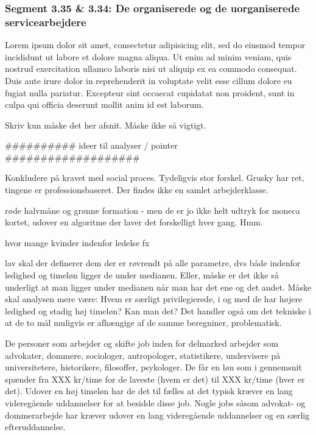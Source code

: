 %
\subsubsection{Segment 3.35 \& 3.34: De organiserede og de uorganiserede servicearbejdere }
%

Lorem ipsum dolor sit amet, consectetur adipisicing elit, sed do eiusmod
tempor incididunt ut labore et dolore magna aliqua. Ut enim ad minim veniam,
quis nostrud exercitation ullamco laboris nisi ut aliquip ex ea commodo
consequat. Duis aute irure dolor in reprehenderit in voluptate velit esse
cillum dolore eu fugiat nulla pariatur. Excepteur sint occaecat cupidatat non
proident, sunt in culpa qui officia deserunt mollit anim id est laborum.

Skriv kun måske det her afsnit. Måske ikke så vigtigt. 








\iffalse


########## ideer til analyser / pointer ###################

Konkludere på kravet med social proces. Tydeligvis stor forskel. Grusky har ret, tingene er professionsbaseret. Der findes ikke en samlet arbejderklasse. %


røde halvmåne og grønne formation - men de er jo ikke helt udtryk for moneca kortet, udover en algoritme der laver det forskelligt hver gang. Hmm. 

hvor mange kvinder indenfor ledelse fx 


lav skal der definerer dem der er røvrendt på alle parametre, dvs både indenfor ledighed og timeløn ligger de under medianen. Eller, måske er det ikke så underligt at man ligger under medianen når man har det ene og det andet. Måske skal analysen mere være: Hvem er særligt privilegierede, i og med de har højere ledighed og stadig høj timeløn? Kan man det? Det handler også om det tekniske i at de to mål muligvis er afhængige af de samme beregniner, problematisk. 


De personer som arbejder og skifte job inden for delmarked  arbejder som advokater, dommere, sociologer, antropologer, statistikere, undervisere på universitetere, historikere, filosoffer, psykologer. De får en løn som i gennemsnit spænder fra XXX kr/time for de laveste (hvem er det) til XXX kr/time (hver er det). Udover en høj timeløn har de det til fælles at det typisk kræver en lang videregående uddannelser for at besidde disse job. Nogle jobs såsom advokat- og dommerarbejde har kræver udover en lang videregående uddannelser og en særlig efteruddannelse.

